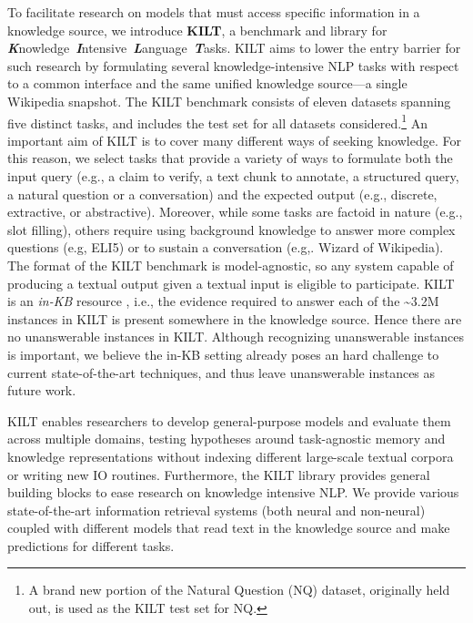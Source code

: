 \documentclass[11pt]{article}
\begin{document}
To facilitate research on models that must access specific information in a knowledge source, we introduce \textbf{KILT}, a benchmark and library for \textbf{\emph{K}}nowledge~\textbf{\emph{I}}ntensive~\textbf{\emph{L}}anguage~\textbf{\emph{T}}asks. KILT aims to lower the entry barrier for such research by formulating several knowledge-intensive NLP tasks with respect to a common interface and the same unified knowledge source---a single Wikipedia snapshot. 
The KILT benchmark consists of eleven datasets spanning five distinct tasks, and includes the test set for all datasets considered.\footnote{A brand new portion of the Natural Question (NQ) dataset, originally held out, is used as the KILT test set for NQ.} 
An important aim of KILT is to cover many different ways of seeking knowledge. For this reason, we select tasks that provide a variety of ways to formulate both the input query (e.g., a claim to verify, a text chunk to annotate, a structured query, a natural question or a conversation) and the expected output (e.g., discrete, extractive, or abstractive). Moreover, while some tasks are factoid in nature (e.g., slot filling), others require using background knowledge to answer more complex questions (e.g, ELI5) or to sustain a conversation (e.g,. Wizard of Wikipedia). 
The format of the KILT benchmark is model-agnostic, so any system capable of producing a textual output given a textual input is eligible to participate. KILT is an \textit{in-KB} resource \cite{petroni2015core}, i.e., the evidence required to answer each of the \textasciitilde3.2M instances in KILT is present somewhere in the knowledge source. Hence there are no unanswerable instances in KILT. Although recognizing unanswerable instances is important, we believe the in-KB setting already poses an hard challenge to current state-of-the-art techniques, and thus leave unanswerable instances as future work.

KILT enables researchers to develop general-purpose models and evaluate them across multiple domains, testing hypotheses around task-agnostic memory and knowledge representations without 
indexing different large-scale textual corpora or writing new IO routines.
Furthermore, the KILT library provides general building blocks to ease research on knowledge intensive NLP. We provide various state-of-the-art information retrieval systems (both neural and non-neural) coupled with different models that read text in the knowledge source and make predictions for different tasks.
\end{document}
